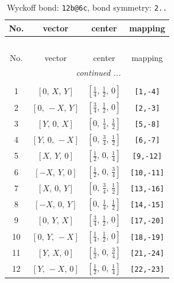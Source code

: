 \documentclass[fleqn,8pt]{jsarticle}
\begin{document}
\renewcommand{\arraystretch}{1.2}
\begin{longtable}{cccc}
\caption{Wyckoff bond: {\tt 12b@6c}, bond symmetry: {\tt 2..}}
 \\
 \hline \hline
No. & vector & center & mapping \\ \hline \endfirsthead

\multicolumn{3}{l}{\tablename\ \thetable{}} \\
 \hline \hline
No. & vector & center & mapping \\ \hline \endhead

 \hline \hline
\multicolumn{3}{r}{\footnotesize\it continued ...} \\ \endfoot

 \hline \hline
\multicolumn{3}{r}{} \\ \endlastfoot

1 & $\left[ 0,\, X,\, Y \right]$ & $\left[ \frac{1}{4},\, \frac{1}{2},\, 0 \right]$ & {\tt [1,-4]} \\ \hline
2 & $\left[ 0,\, - X,\, Y \right]$ & $\left[ \frac{3}{4},\, \frac{1}{2},\, 0 \right]$ & {\tt [2,-3]} \\ \hline
3 & $\left[ Y,\, 0,\, X \right]$ & $\left[ 0,\, \frac{1}{4},\, \frac{1}{2} \right]$ & {\tt [5,-8]} \\ \hline
4 & $\left[ Y,\, 0,\, - X \right]$ & $\left[ 0,\, \frac{3}{4},\, \frac{1}{2} \right]$ & {\tt [6,-7]} \\ \hline
5 & $\left[ X,\, Y,\, 0 \right]$ & $\left[ \frac{1}{2},\, 0,\, \frac{1}{4} \right]$ & {\tt [9,-12]} \\ \hline
6 & $\left[ - X,\, Y,\, 0 \right]$ & $\left[ \frac{1}{2},\, 0,\, \frac{3}{4} \right]$ & {\tt [10,-11]} \\ \hline
7 & $\left[ X,\, 0,\, Y \right]$ & $\left[ 0,\, \frac{3}{4},\, \frac{1}{2} \right]$ & {\tt [13,-16]} \\ \hline
8 & $\left[ - X,\, 0,\, Y \right]$ & $\left[ 0,\, \frac{1}{4},\, \frac{1}{2} \right]$ & {\tt [14,-15]} \\ \hline
9 & $\left[ 0,\, Y,\, X \right]$ & $\left[ \frac{3}{4},\, \frac{1}{2},\, 0 \right]$ & {\tt [17,-20]} \\ \hline
10 & $\left[ 0,\, Y,\, - X \right]$ & $\left[ \frac{1}{4},\, \frac{1}{2},\, 0 \right]$ & {\tt [18,-19]} \\ \hline
11 & $\left[ Y,\, X,\, 0 \right]$ & $\left[ \frac{1}{2},\, 0,\, \frac{3}{4} \right]$ & {\tt [21,-24]} \\ \hline
12 & $\left[ Y,\, - X,\, 0 \right]$ & $\left[ \frac{1}{2},\, 0,\, \frac{1}{4} \right]$ & {\tt [22,-23]} \\
\end{longtable}
\end{document}
